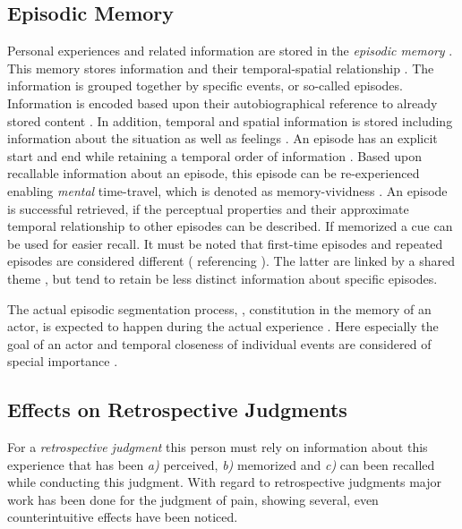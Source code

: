 \subsection{Episodic Memory}
Personal experiences and related information are stored in the \emph{episodic memory} \citep{tulving_episodic_1972}.
This memory stores information and their temporal-spatial relationship \citep[][p. 385]{tulving_episodic_1972}.
The information is grouped together by specific events, or so-called episodes.
Information is encoded based upon their autobiographical reference to already stored content \citep[][p. 385f.]{tulving_episodic_1972}.
In addition, temporal and spatial information is stored including information about the situation as well as feelings \citep[][p. 385f.]{tulving_episodic_1972}.
An episode has an explicit start and end while retaining a temporal order of information \citep[][p. 262]{conway_construction_2000}.
Based upon recallable information about an episode, this episode can be re-experienced enabling \emph{mental} time-travel, which is denoted as memory-vividness \citep{conway_construction_2000}.
An episode is successful retrieved, if the perceptual properties and their approximate temporal relationship to other episodes can be described.
If memorized a cue can be used for easier recall.
It must be noted that first-time episodes and repeated episodes are considered different (\citet{conway_construction_2000} referencing \citet{barsalou_construction_1988}).
The latter are linked by a shared theme \citep{robinson_first_1992}, but tend to retain be less distinct information about specific episodes.

The actual episodic segmentation process, \ie, constitution in the memory of an actor, is expected to happen during the actual experience \citep{ezzyat_what_2011, kurby_segmentation_2008}.
Here especially the goal of an actor and temporal closeness of individual events are considered of special importance \cite{black_episodes_1979}.

\subsection{Effects on Retrospective Judgments}
For a \emph{retrospective judgment} this person must rely on information about this experience that has been \emph{a)} perceived, \emph{b)} memorized and \emph{c)} can been recalled while conducting this judgment.
With regard to retrospective judgments major work has been done for the judgment of pain, showing several, even counterintuitive effects have been noticed.


